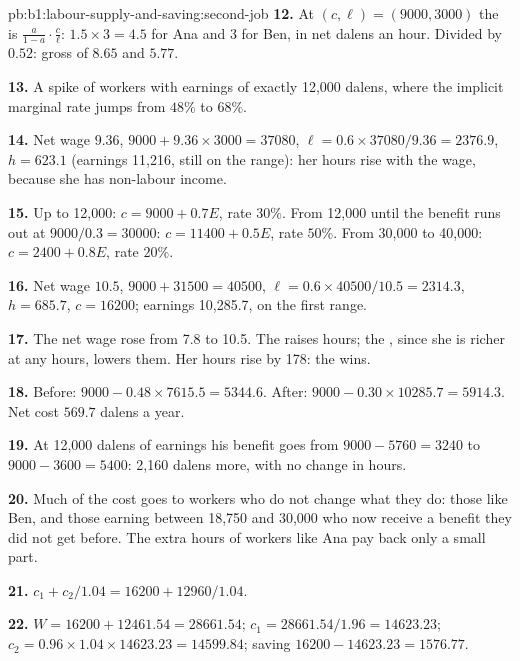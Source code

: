 \begin{solution}{pb:b1:labour-supply-and-saving:second-job}
\textbf{12.} At $(c, \ell) = (9000, 3000)$ the  is $\tfrac{a}{1 - a}\cdot\tfrac{c}{\ell}$: $1.5 \times 3 = 4.5$
for Ana and $3$ for Ben, in net dalens an hour. Divided by $0.52$: gross
 of $8.65$ and $5.77$.

\textbf{13.} A spike of workers with earnings of exactly 12,000 dalens, where
the implicit marginal rate jumps from $48\%$ to $68\%$.

\textbf{14.} Net wage $9.36$,  $9000 + 9.36 \times 3000 = 37080$,
$\ell = 0.6 \times 37080/9.36 = 2376.9$, $h = 623.1$ (earnings 11,216, still on the
range): her hours rise with the wage, because she has non-labour income.

\textbf{15.} Up to 12,000: $c = 9000 + 0.7E$, rate $30\%$. From 12,000 until the
benefit runs out at $9000/0.3 = 30000$: $c = 11400 + 0.5E$, rate $50\%$. From 30,000
to 40,000: $c = 2400 + 0.8E$, rate $20\%$.

\textbf{16.} Net wage $10.5$,  $9000 + 31500 = 40500$,
$\ell = 0.6 \times 40500/10.5 = 2314.3$, $h = 685.7$, $c = 16200$; earnings 10,285.7, on
the first range.

\textbf{17.} The net wage rose from 7.8 to 10.5. The  raises
hours; the , since she is richer at any hours, lowers them.
Her hours rise by 178: the  wins.

\textbf{18.} Before: $9000 - 0.48 \times 7615.5 = 5344.6$. After:
$9000 - 0.30 \times 10285.7 = 5914.3$. Net cost $569.7$ dalens a year.

\textbf{19.} At 12,000 dalens of earnings his benefit goes from
$9000 - 5760 = 3240$ to $9000 - 3600 = 5400$: 2,160 dalens more, with no change in
hours.

\textbf{20.} Much of the cost goes to workers who do not change what they do:
those like Ben, and those earning between 18,750 and 30,000 who now receive a
benefit they did not get before. The extra hours of workers like Ana pay
back only a small part.

\textbf{21.} $c_1 + c_2/1.04 = 16200 + 12960/1.04$.

\textbf{22.} $W = 16200 + 12461.54 = 28661.54$; $c_1 = 28661.54/1.96 = 14623.23$;
$c_2 = 0.96 \times 1.04 \times 14623.23 = 14599.84$; saving $16200 - 14623.23 = 1576.77$.


\end{solution}
